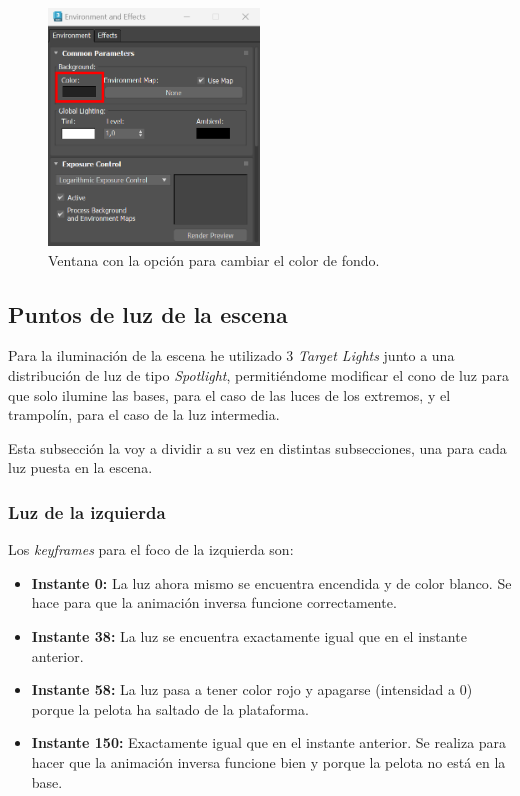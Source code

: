 \begin{figure}[H]
   \centering
   \includegraphics[width=0.5\textwidth]{imagenes/misc/bg-color2.png}
   \caption{Ventana con la opción para cambiar el color de fondo.}
\end{figure}

\subsection{Puntos de luz de la escena}
Para la iluminación de la escena he utilizado 3 \textit{Target Lights} junto a una distribución de luz de tipo \textit{Spotlight}, permitiéndome modificar el cono de luz para que solo ilumine las bases, para el caso de las luces de los extremos, y el trampolín, para el caso de la luz intermedia.

\bigskip

Esta subsección la voy a dividir a su vez en distintas subsecciones, una para cada luz puesta en la escena.

\subsubsection{Luz de la izquierda}

Los \textit{keyframes} para el foco de la izquierda son:

\begin{itemize}
   \item \textbf{Instante 0: }La luz ahora mismo se encuentra encendida y de color blanco. Se hace para que la animación inversa funcione correctamente.
   \item \textbf{Instante 38: }La luz se encuentra exactamente igual que en el instante anterior.
   \item \textbf{Instante 58: }La luz pasa a tener color rojo y apagarse (intensidad a 0) porque la pelota ha saltado de la plataforma.
   \item \textbf{Instante 150: }Exactamente igual que en el instante anterior. Se realiza para hacer que la animación inversa funcione bien y porque la pelota no está en la base.
\end{itemize}

